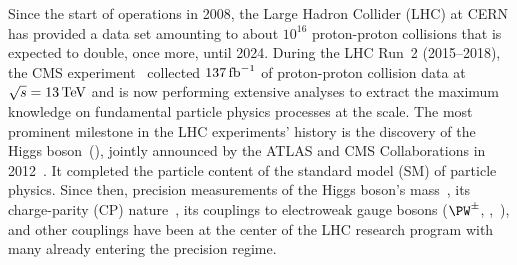 \documentclass[a4paper,11pt]{article}
\newcommand{\Pb}{{{\Pqb}}\xspace}
\newcommand{\Pt}{{{\Pqt}}\xspace}
\newcommand{\Ps}{{{\Pqs}}\xspace}
\newcommand{\Pc}{{{\Pqc}}\xspace}
\newcommand{\Pd}{{{\Pqd}}\xspace}
\newcommand{\Pu}{{{\Pqu}}\xspace}
\begin{document}
Since the start of operations in 2008, the Large Hadron Collider (LHC) at CERN has provided a data set amounting to about $10^{16}$ proton-proton collisions that is expected to double, once more, until 2024.
During the LHC Run~2 (2015--2018), the CMS experiment~\cite{CMS_ex} collected  $137\mbox{\ensuremath{\,\text{fb}^{-1}}}$ of proton-proton collision data at $\sqrt{s}=13\,\text{Te\hspace{-.08em}V}$ and is now performing extensive analyses to extract the maximum knowledge on fundamental particle physics processes at the \TeV scale.
The most prominent milestone in the LHC experiments' history is the discovery of the Higgs boson~(\PH), jointly announced by the ATLAS and CMS Collaborations in 2012~\cite{Aad:2012tfa,Chatrchyan:2012ufa}.
It completed the particle content of the standard model (SM) of particle physics. 
Since then, precision measurements of the Higgs boson's mass~\cite{CMS:2017dib,CMS:2020xrn}, its charge-parity (CP) nature~\cite{CMS:2019jdw,CMS:2020cga}, its couplings to electroweak gauge bosons ($\PW^{\pm}$, \PZ,~\Pgg), and other couplings have been at the center of the LHC research program with many already entering the precision regime.

\end{document}
